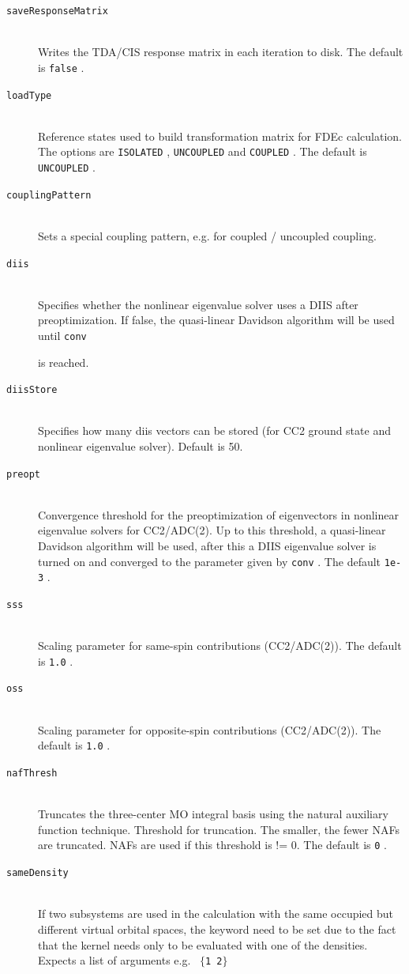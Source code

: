 \documentclass[bibliography=totocnumbered,a4paper,10pt,oneside]{scrbook}
\newcommand{\ttt}[1]{%
  \begingroup\setlength{\fboxsep}{1pt}%
  \colorbox{serenity-green!30}{\texttt{\hspace*{2pt}\vphantom{(g}#1\hspace*{2pt}}}%
  \endgroup
}
\begin{document}
\begin{description}
    \item [\texttt{saveResponseMatrix}]\hfill \\
    Writes the TDA/CIS response matrix in each iteration to disk. The default is \ttt{false}.
    \item [\texttt{loadType}]\hfill \\
    Reference states used to build transformation matrix for FDEc calculation. The options are \ttt{ISOLATED}, \ttt{UNCOUPLED} and \ttt{COUPLED}. The default is \ttt{UNCOUPLED}.
    \item[\texttt{couplingPattern}]\hfill\\
    Sets a special coupling pattern, e.g. for coupled / uncoupled coupling.
    \item[\texttt{diis}]\hfill\\
    Specifies whether the nonlinear eigenvalue solver uses a DIIS after preoptimization. If false, the quasi-linear Davidson algorithm will be used until \ttt{conv}
    is reached.
    \item[\texttt{diisStore}]\hfill\\
    Specifies how many diis vectors can be stored (for CC2 ground state and nonlinear
    eigenvalue solver). Default is 50.
    \item[\texttt{preopt}]\hfill\\
    Convergence threshold for the preoptimization of eigenvectors in nonlinear
    eigenvalue solvers for CC2/ADC(2). Up to this threshold, a quasi-linear
    Davidson algorithm will be used, after this a DIIS eigenvalue solver 
    is turned on and converged to the parameter given by \ttt{conv}. The default \ttt{1e-3}.
    \item[\texttt{sss}]\hfill\\
    Scaling parameter for same-spin contributions (CC2/ADC(2)). The default is \ttt{1.0}.
    \item[\texttt{oss}]\hfill\\
    Scaling parameter for opposite-spin contributions (CC2/ADC(2)). The default is \ttt{1.0}.
    \item[\texttt{nafThresh}]\hfill\\
    Truncates the three-center MO integral basis using the natural auxiliary function technique.
    Threshold for truncation. The smaller, the fewer NAFs are truncated. NAFs are used if this 
    threshold is != 0. The default is \ttt{0}.
    \item[\texttt{sameDensity}]\hfill\\
    If two subsystems are used in the calculation with the same occupied but different virtual orbital spaces, the keyword need to be set due to the fact that the kernel needs only to be evaluated with one of the densities. Expects a list of arguments e.g.~\ttt{$\{$1 2$\}$}

\end{description}
\end{document}
